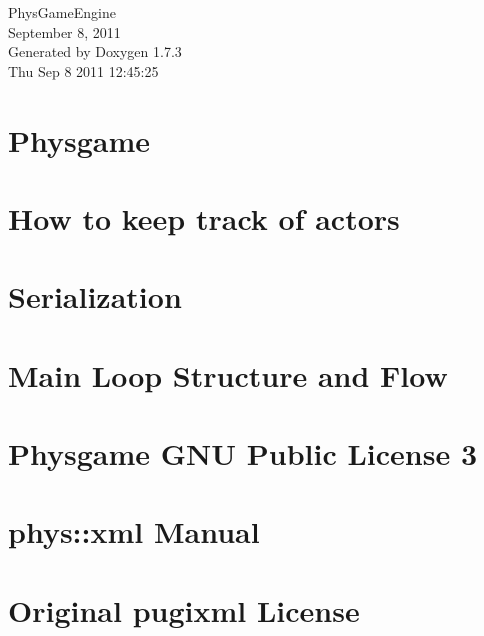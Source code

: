 \documentclass[a4paper]{article}
\begin{document}
\hypersetup{pageanchor=false}
\begin{titlepage}
\vspace*{7cm}
\begin{center}
{\Large PhysGameEngine \\[1ex]\large September 8, 2011 }\\
\vspace*{1cm}
{\large Generated by Doxygen 1.7.3}\\
\vspace*{0.5cm}
{\small Thu Sep 8 2011 12:45:25}\\
\end{center}
\end{titlepage}
\tableofcontents
{}
\hypersetup{pageanchor=true}
\section{Physgame}
\label{index}\hypertarget{index}{}
\section{How to keep track of actors}
\label{actorcontainer1}
\hypertarget{actorcontainer1}{}

\section{Serialization}
\label{Serialization}
\hypertarget{Serialization}{}

\section{Main Loop Structure and Flow}
\label{mainloop1}
\hypertarget{mainloop1}{}

\section{Physgame GNU Public License 3}
\label{GPLLicense}
\hypertarget{GPLLicense}{}

\section{phys::xml Manual}
\label{XMLManual}
\hypertarget{XMLManual}{}

\section{Original pugixml License}
\label{OriginalpugixmlLicense}
\hypertarget{OriginalpugixmlLicense}{}

\end{document}
